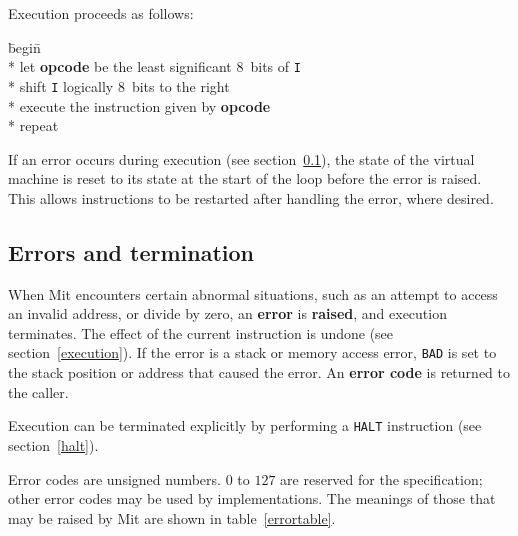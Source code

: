 \documentclass[a4paper]{article}
\newcommand{\instsize}{$8$}
\begin{document}
Execution proceeds as follows:

\begin{tabbing}
\hspace{0.5in}\=begin\=\+\+ \\*
let \textbf{opcode} be the least significant \instsize\ bits of {\tt I} \\*
shift {\tt I} logically \instsize\ bits to the right \\*
execute the instruction given by \textbf{opcode} \- \\*
repeat
\end{tabbing}

If an error occurs during execution (see section~\ref{errors}), the state of the virtual machine is reset to its state at the start of the loop before the error is raised. This allows instructions to be restarted after handling the error, where desired.

\subsection{Errors and termination}
\label{errors}

When Mit encounters certain abnormal situations, such as an attempt to access an invalid address, or divide by zero, an {\bf error} is {\bf raised}, and execution terminates. The effect of the current instruction is undone (see section~\ref{execution}). If the error is a stack or memory access error, {\tt BAD} is set to the stack position or address that caused the error. An {\bf error code} is returned to the caller.

Execution can be terminated explicitly by performing a {\tt HALT} instruction (see section~\ref{halt}).

Error codes are unsigned numbers. $0$ to $127$ are reserved for the specification; other error codes may be used by implementations. The meanings of those that may be raised by Mit are shown in table~\ref{errortable}.
\end{document}

